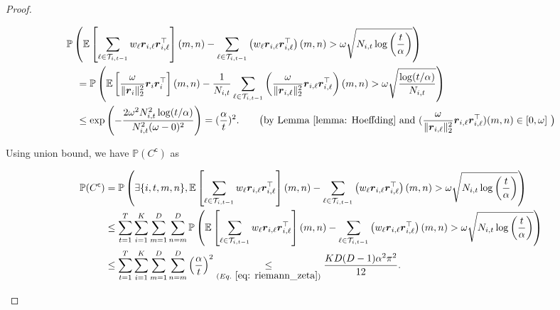 \begin{proof}
\begin{small}
\[
\begin{aligned}
& \mathbb{P} \left( \mathbb{E} \left[ \sum_{\ell \in \mathcal{T}_{i,t-1}} w_{\ell} \boldsymbol{r}_{i,\ell} \boldsymbol{r}_{i,\ell}^{\top} \right](m,n)
-
\sum_{\ell \in \mathcal{T}_{i,t-1}} \left( w_{\ell} \boldsymbol{r}_{i,\ell} \boldsymbol{r}_{i,\ell}^{\top} \right)(m,n)
>
\omega \sqrt{ N_{i,t} \log \left( \frac{t}{\alpha} \right)} \right) \\
& \quad = 
\mathbb{P} \left( \mathbb{E} \left[ \frac{\omega}{\Vert \boldsymbol{r}_{i} \Vert_2^2} \boldsymbol{r}_{i} \boldsymbol{r}_{i}^{\top} \right](m,n)
-
\frac{1}{N_{i,t}} \sum_{\ell \in \mathcal{T}_{i,t-1}} \left( 
\frac{\omega}{\Vert \boldsymbol{r}_{i,\ell} \Vert_2^2} \boldsymbol{r}_{i,\ell} \boldsymbol{r}_{i,\ell}^{\top} \right)(m,n)
>
\omega \sqrt{\frac{ \log(t/\alpha)}{N_{i,t}}} \right) \\
& \quad \leq 
\exp \left( - \frac{ 2 \omega^2 N_{i,t}^2 \log(t/\alpha) }{ N_{i,t}^2 (\omega - 0)^2 } \right) 
=
(\frac{\alpha}{t})^2.
\qquad \text{\big(by Lemma \ref{lemma: Hoeffding} and $( \frac{\omega}{\Vert \boldsymbol{r}_{i,\ell} \Vert_2^2} \boldsymbol{r}_{i,\ell} \boldsymbol{r}_{i,\ell}^{\top})(m,n) \in [0,\omega]$ \big)}
\end{aligned}
\]
\end{small}

Using union bound, we have $\mathbb{P} (C^{\mathsf{c}})$ as
\begin{small}
\begin{equation}
\begin{aligned}
\label{eq: conf_C_upbd}
\mathbb{P} (C^\mathsf{c}) 
& = 
\mathbb{P} \left( \exists \{i,t,m,n\}, \mathbb{E} \left[ \sum_{\ell \in \mathcal{T}_{i,t-1}} w_{\ell} \boldsymbol{r}_{i,\ell} \boldsymbol{r}_{i,\ell}^{\top} \right](m,n)
-
\sum_{\ell \in \mathcal{T}_{i,t-1}} \left( w_{\ell} \boldsymbol{r}_{i,\ell} \boldsymbol{r}_{i,\ell}^{\top} \right)(m,n)
>
\omega \sqrt{ N_{i,t} \log \left( \frac{t}{\alpha} \right)} \right) \\
& \leq
\sum_{t=1}^{T}
\sum_{i=1}^{K}
\sum_{m=1}^{D}
\sum_{n=m}^{D}
\mathbb{P} \left( \mathbb{E} \left[ \sum_{\ell \in \mathcal{T}_{i,t-1}} w_{\ell} \boldsymbol{r}_{i,\ell} \boldsymbol{r}_{i,\ell}^{\top} \right](m,n)
-
\sum_{\ell \in \mathcal{T}_{i,t-1}} \left( w_{\ell} \boldsymbol{r}_{i,\ell} \boldsymbol{r}_{i,\ell}^{\top} \right)(m,n)
>
\omega \sqrt{ N_{i,t} \log \left( \frac{t}{\alpha} \right)} \right) \\
& \leq 
\sum_{t=1}^{T}
\sum_{i=1}^{K}
\sum_{m=1}^{D}
\sum_{n=m}^{D} \left( \frac{\alpha}{t} \right)^2
\underset{(Eq.~\ref{eq: riemann_zeta})}{\leq }
\frac{KD(D-1) \alpha^2 \pi^2}{12}.
\end{aligned}
\end{equation}
\end{small}


\end{proof}
